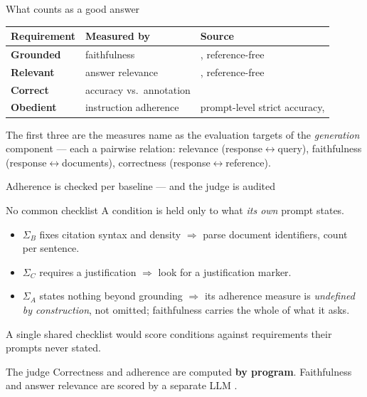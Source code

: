 \documentclass[11pt,aspectratio=169]{beamer}
\begin{document}
\begin{frame}{What counts as a good answer}
  \begin{center}\scriptsize
  \begin{tabular}{@{}llp{6.4cm}@{}}
    \toprule
    Requirement & Measured by & Source \\
    \midrule
    \textbf{Grounded} & faithfulness & \citet{es2023ragas}, reference-free \\
    \textbf{Relevant} & answer relevance & \citet{es2023ragas}, reference-free \\
    \textbf{Correct} & accuracy vs.\ annotation & \citet{chen2024rgb} \\
    \textbf{Obedient} & instruction adherence & prompt-level strict accuracy, \citet{zhou2023ifeval} \\
    \bottomrule
  \end{tabular}
  \end{center}
  \smallskip
  \scriptsize
  The first three are the measures \citet{yu2024ragevalsurvey} name as the
  evaluation targets of the \emph{generation} component --- each a pairwise
  relation: relevance (response$\leftrightarrow$query), faithfulness
  (response$\leftrightarrow$documents), correctness
  (response$\leftrightarrow$reference).
\end{frame}

\begin{frame}{Adherence is checked per baseline --- and the judge is audited}
  \begin{block}{No common checklist}
    \scriptsize A condition is held only to what \emph{its own} prompt states.
    \begin{itemize}\small
      \item[] \hspace{-1em}$\Sigma_B$ fixes citation syntax and density $\Rightarrow$ parse
            document identifiers, count per sentence.
      \item $\Sigma_C$ requires a justification $\Rightarrow$ look for a
            justification marker.
      \item $\Sigma_A$ states nothing beyond grounding $\Rightarrow$ its
            adherence measure is \emph{undefined by construction}, not
            omitted; faithfulness carries the whole of what it asks.
    \end{itemize}
    \small A single shared checklist would score conditions against
    requirements their prompts never stated.
  \end{block}
  \begin{block}{The judge}
    \scriptsize Correctness and adherence are computed \textbf{by program}. Faithfulness
    and answer relevance are scored by a separate LLM
    \citep{es2023ragas,saadfalcon2024ares}.
  \end{block}
\end{frame}
\end{document}
